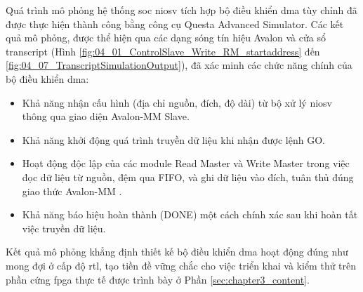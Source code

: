 Quá trình mô phỏng hệ thống \acrshort{soc} \acrshort{niosv} tích hợp bộ điều khiển \acrshort{dma} tùy chỉnh đã được thực hiện thành công bằng công cụ Questa Advanced Simulator. Các kết quả mô phỏng, được thể hiện qua các dạng sóng tín hiệu Avalon và cửa sổ transcript (Hình \ref{fig:04_01_ControlSlave_Write_RM_startaddress} đến \ref{fig:04_07_TranscriptSimulationOutput}), đã xác minh các chức năng chính của bộ điều khiển \acrshort{dma}:
\begin{itemize}
    \item Khả năng nhận cấu hình (địa chỉ nguồn, đích, độ dài) từ bộ xử lý \acrshort{niosv} thông qua giao diện Avalon-MM Slave.
    \item Khả năng khởi động quá trình truyền dữ liệu khi nhận được lệnh GO.
    \item Hoạt động độc lập của các module Read Master và Write Master trong việc đọc dữ liệu từ nguồn, đệm qua FIFO, và ghi dữ liệu vào đích, tuân thủ đúng giao thức Avalon-MM \cite{avalon_mm_transfer}.
    \item Khả năng báo hiệu hoàn thành (DONE) một cách chính xác sau khi hoàn tất việc truyền dữ liệu.
\end{itemize}
Kết quả mô phỏng khẳng định thiết kế bộ điều khiển \acrshort{dma} hoạt động đúng như mong đợi ở cấp độ \acrfull{rtl}, tạo tiền đề vững chắc cho việc triển khai và kiểm thử trên phần cứng \acrshort{fpga} thực tế được trình bày ở Phần \ref{sec:chapter3_content}. %

\FloatBarrier %